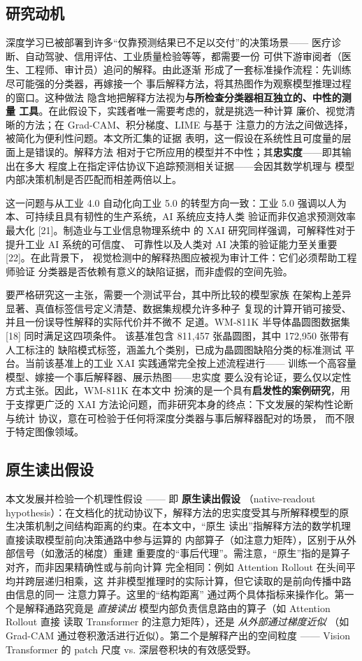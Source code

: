 \documentclass[11pt,a4paper]{article}
\begin{document}
\subsection{研究动机}

深度学习已被部署到许多“仅靠预测结果已不足以交付”的决策场景—— 医疗诊断、自动驾驶、信用评估、工业质量检验等等，都需要一份 可供下游审阅者（医生、工程师、审计员）追问的解释。由此逐渐 形成了一套标准操作流程：先训练尽可能强的分类器，再嫁接一个 事后解释方法，将其热图作为观察模型推理过程的窗口。这种做法 隐含地把解释方法视为\textbf{与所检查分类器相互独立的、中性的测量 工具}。在此假设下，实践者唯一需要考虑的，就是挑选一种计算 廉价、视觉清晰的方法；在 Grad-CAM、积分梯度、LIME 与基于 注意力的方法之间做选择，被简化为便利性问题。本文所汇集的证据 表明，这一假设在系统性且可度量的层面上是错误的。解释方法 相对于它所应用的模型并不中性；其\textbf{忠实度}——即其输出在多大 程度上在指定评估协议下追踪预测相关证据——会因其数学机理与 模型内部决策机制是否匹配而相差两倍以上。

这一问题与从工业 4.0 自动化向工业 5.0 的转型方向一致：工业 5.0 强调以人为本、可持续且具有韧性的生产系统，AI 系统应支持人类 验证而非仅追求预测效率最大化 [21]。制造业与工业信息物理系统中 的 XAI 研究同样强调，可解释性对于提升工业 AI 系统的可信度、 可靠性以及人类对 AI 决策的验证能力至关重要 [22]。在此背景下， 视觉检测中的解释热图应被视为审计工件：它们必须帮助工程师验证 分类器是否依赖有意义的缺陷证据，而非虚假的空间先验。

要严格研究这一主张，需要一个测试平台，其中所比较的模型家族 在架构上差异显著、真值标签信号定义清楚、数据集规模允许多种子 复现的计算开销可接受、并且一份误导性解释的实际代价并不微不 足道。WM-811K 半导体晶圆图数据集 [18] 同时满足这四项条件。 该基准包含 811,457 张晶圆图，其中 172,950 张带有人工标注的 缺陷模式标签，涵盖九个类别，已成为晶圆图缺陷分类的标准测试 平台。当前该基准上的工业 XAI 实践通常完全按上述流程进行—— 训练一个高容量模型、嫁接一个事后解释器、展示热图——忠实度 要么没有论证，要么仅以定性方式主张。因此，WM-811K 在本文中 扮演的是一个具有\textbf{启发性的案例研究}，用于支撑更广泛的 XAI 方法论问题，而非研究本身的终点：下文发展的架构性论断与统计 协议，意在可检验于任何将深度分类器与事后解释器配对的场景， 而不限于特定图像领域。

\subsection{原生读出假设}

本文发展并检验一个机理性假设 —— 即 \textbf{原生读出假设} （native-readout hypothesis）：在文档化的扰动协议下，解释方法的忠实度受其与所解释模型的原生决策机制之间结构距离的约束。在本文中，“原生 读出”指解释方法的数学机理直接读取模型前向决策通路中参与运算的 内部算子（如注意力矩阵），区别于从外部信号（如激活的梯度）重建 重要度的“事后代理”。需注意，“原生”指的是算子对齐，而非因果精确性或与前向计算 完全相同：例如 Attention Rollout 在头间平均并跨层递归相乘，这 并非模型推理时的实际计算，但它读取的是前向传播中路由信息的同一 注意力算子。这里的“结构距离” 通过两个具体指标来操作化。第一个是解释通路究竟是 \emph{直接读出} 模型内部负责信息路由的算子（如 Attention Rollout 直接 读取 Transformer 的注意力矩阵），还是 \emph{从外部通过梯度近似} （如 Grad-CAM 通过卷积激活进行近似）。第二个是解释产出的空间粒度 —— Vision Transformer 的 patch 尺度 vs. 深层卷积块的有效感受野。
\end{document}
